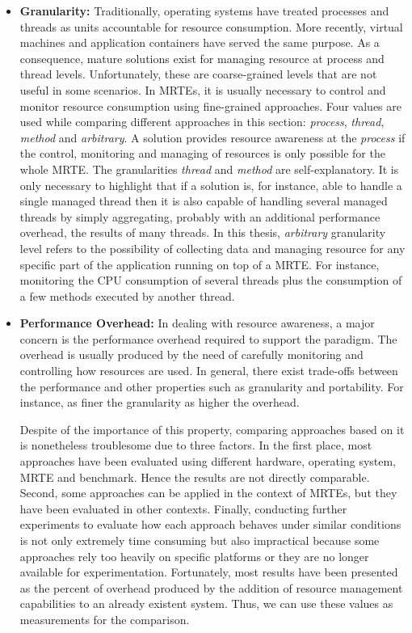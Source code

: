 \begin{itemize}
\item \textbf{Granularity:}
Traditionally, operating systems have treated processes and threads as units accountable for resource consumption.
More recently, virtual machines and application containers have served the same purpose.
As a consequence, mature solutions exist for managing resource at process and thread levels.
Unfortunately, these are coarse-grained levels that are not useful in some scenarios.
In MRTEs, it is usually necessary to control and monitor resource consumption using fine-grained approaches.
Four values are used while comparing different approaches in this section: \textit{process}, \textit{thread}, \textit{method} and \textit{arbitrary}.
A solution provides resource awareness at the \textit{process} if the control, monitoring and managing of resources is only possible for the whole MRTE.
The granularities \textit{thread} and \textit{method} are self-explanatory.
It is only necessary to highlight that if a solution is, for instance, able to handle a single managed thread then it is also capable of handling several managed threads by simply aggregating, probably with an additional performance overhead, the results of many threads.
In this thesis, \textit{arbitrary} granularity level refers to the possibility of collecting data and managing resource for any specific part of the application running on top of a MRTE.
For instance, monitoring the CPU consumption of several threads plus the consumption of a few methods executed by another thread.


\item \textbf{Performance Overhead:} 
In dealing with resource awareness, a major concern is the performance overhead required to support the paradigm.
The overhead is usually produced by the need of carefully monitoring and controlling how resources are used.
In general, there exist trade-offs between the performance and other properties such as granularity and portability.
For instance, as finer the granularity as higher the overhead.

Despite of the importance of this property, comparing approaches based on it is nonetheless troublesome due to three factors.
In the first place, most approaches have been evaluated using different hardware, operating system, MRTE and benchmark.
Hence the results are not directly comparable.  
Second, some approaches can be applied in the context of MRTEs, but they have been evaluated in other contexts.
Finally, conducting further experiments to evaluate how each approach behaves under similar conditions is not only extremely time consuming but also impractical because some approaches rely too heavily on specific platforms or they are no longer available for experimentation.
Fortunately, most results have been presented as the percent of overhead produced by the addition of resource management capabilities to an already existent system.
Thus, we can use these values as measurements for the comparison.


\end{itemize}
